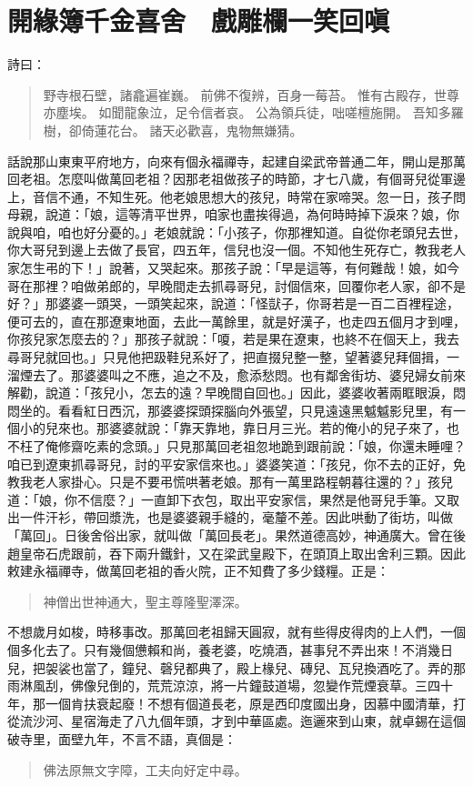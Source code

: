 
\chapter{開緣簿千金喜舍　戲雕欄一笑回嗔}

詩曰：
\begin{quote}
野寺根石壁，諸龕遍崔巍。
前佛不復辨，百身一莓苔。
惟有古殿存，世尊亦塵埃。
如聞龍象泣，足令信者哀。
公為領兵徒，咄嗟檀施開。
吾知多羅樹，卻倚蓮花台。
諸天必歡喜，鬼物無嫌猜。
\end{quote}

話說那山東東平府地方，向來有個永福禪寺，起建自梁武帝普通二年，開山是那萬回老祖。怎麼叫做萬回老祖？因那老祖做孩子的時節，才七八歲，有個哥兒從軍邊上，音信不通，不知生死。他老娘思想大的孩兒，時常在家啼哭。忽一日，孩子問母親，說道：「娘，這等清平世界，咱家也盡挨得過，為何時時掉下淚來？娘，你說與咱，咱也好分憂的。」老娘就說：「小孩子，你那裡知道。自從你老頭兒去世，你大哥兒到邊上去做了長官，四五年，信兒也沒一個。不知他生死存亡，教我老人家怎生弔的下！」說著，又哭起來。那孩子說：「早是這等，有何難哉！娘，如今哥在那裡？咱做弟郎的，早晚間走去抓尋哥兒，討個信來，回覆你老人家，卻不是好？」那婆婆一頭哭，一頭笑起來，說道：「怪獃子，你哥若是一百二百裡程途，便可去的，直在那遼東地面，去此一萬餘里，就是好漢子，也走四五個月才到哩，你孩兒家怎麼去的？」那孩子就說：「嗄，若是果在遼東，也終不在個天上，我去尋哥兒就回也。」只見他把趿鞋兒系好了，把直掇兒整一整，望著婆兒拜個揖，一溜煙去了。那婆婆叫之不應，追之不及，愈添愁悶。也有鄰舍街坊、婆兒婦女前來解勸，說道：「孩兒小，怎去的遠？早晚間自回也。」因此，婆婆收著兩眶眼淚，悶悶坐的。看看紅日西沉，那婆婆探頭探腦向外張望，只見遠遠黑魆魆影兒里，有一個小的兒來也。那婆婆就說：「靠天靠地，靠日月三光。若的俺小的兒子來了，也不枉了俺修齋吃素的念頭。」只見那萬回老祖忽地跪到跟前說：「娘，你還未睡哩？咱已到遼東抓尋哥兒，討的平安家信來也。」婆婆笑道：「孩兒，你不去的正好，免教我老人家掛心。只是不要弔慌哄著老娘。那有一萬里路程朝暮往還的？」孩兒道：「娘，你不信麼？」一直卸下衣包，取出平安家信，果然是他哥兒手筆。又取出一件汗衫，帶回漿洗，也是婆婆親手縫的，毫釐不差。因此哄動了街坊，叫做「萬回」。日後舍俗出家，就叫做「萬回長老」。果然道德高妙，神通廣大。曾在後趙皇帝石虎跟前，吞下兩升鐵針，又在梁武皇殿下，在頭頂上取出舍利三顆。因此敕建永福禪寺，做萬回老祖的香火院，正不知費了多少錢糧。正是：
\begin{quote}
神僧出世神通大，聖主尊隆聖澤深。
\end{quote}

不想歲月如梭，時移事改。那萬回老祖歸天圓寂，就有些得皮得肉的上人們，一個個多化去了。只有幾個憊賴和尚，養老婆，吃燒酒，甚事兒不弄出來！不消幾日兒，把袈裟也當了，鐘兒、磬兒都典了，殿上椽兒、磚兒、瓦兒換酒吃了。弄的那雨淋風刮，佛像兒倒的，荒荒涼涼，將一片鐘鼓道場，忽變作荒煙衰草。三四十年，那一個肯扶衰起廢！不想有個道長老，原是西印度國出身，因慕中國清華，打從流沙河、星宿海走了八九個年頭，才到中華區處。迤邐來到山東，就卓錫在這個破寺里，面壁九年，不言不語，真個是：
\begin{quote}
佛法原無文字障，工夫向好定中尋。
\end{quote}

